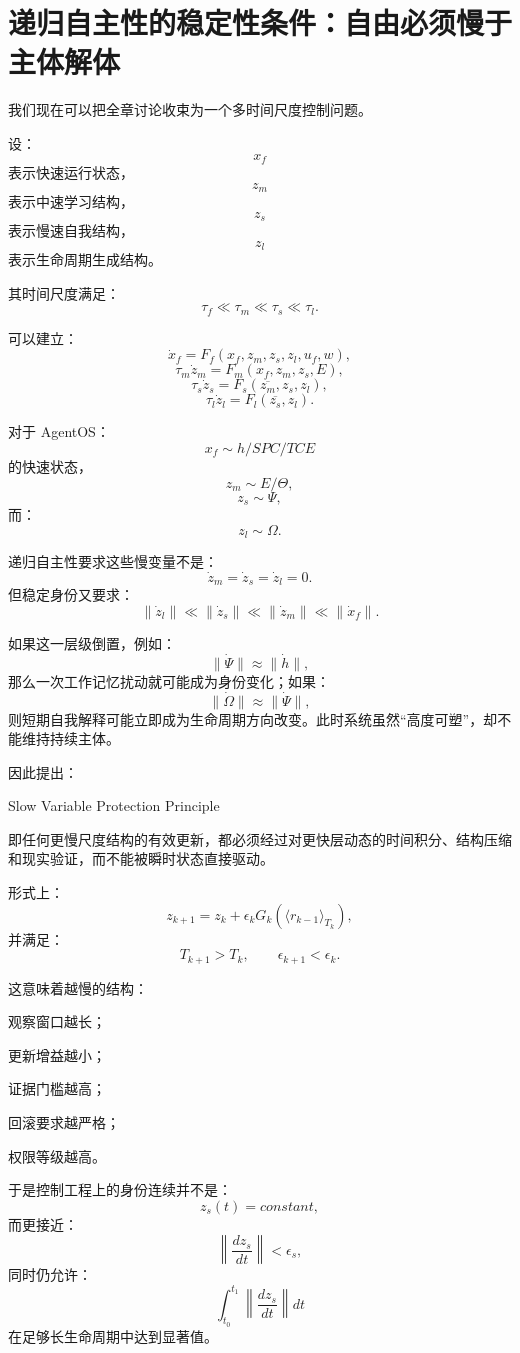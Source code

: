 \section{递归自主性的稳定性条件：自由必须慢于主体解体}

我们现在可以把全章讨论收束为一个多时间尺度控制问题。

设：
\[
x_f
\]
表示快速运行状态，
\[
z_m
\]
表示中速学习结构，
\[
z_s
\]
表示慢速自我结构，
\[
z_l
\]
表示生命周期生成结构。

其时间尺度满足：
\[
\tau_f
\ll
\tau_m
\ll
\tau_s
\ll
\tau_l.
\]

可以建立：
\[
\dot x_f
=
F_f(
x_f,z_m,z_s,z_l,u_f,w
),
\]
\[
\tau_m\dot z_m
=
F_m(
x_f,z_m,z_s,E
),
\]
\[
\tau_s\dot z_s
=
F_s(
\overline{z_m},z_s,z_l
),
\]
\[
\tau_l\dot z_l
=
F_l(
\overline{z_s},z_l
).
\]

对于 AgentOS：
\[
x_f\sim h/SPC/TCE
\]
的快速状态，
\[
z_m\sim E/\Theta,
\]
\[
z_s\sim\Psi,
\]
而：
\[
z_l\sim\Omega.
\]

递归自主性要求这些慢变量不是：
\[
\dot z_m
=
\dot z_s
=
\dot z_l
=
0.
\]
但稳定身份又要求：
\[
\boxed{
\|\dot z_l\|
\ll
\|\dot z_s\|
\ll
\|\dot z_m\|
\ll
\|\dot x_f\|.
}
\]

如果这一层级倒置，例如：
\[
\|\dot\Psi\|
\approx
\|\dot h\|,
\]
那么一次工作记忆扰动就可能成为身份变化；如果：
\[
\|\dot\Omega\|
\approx
\|\dot\Psi\|,
\]
则短期自我解释可能立即成为生命周期方向改变。此时系统虽然“高度可塑”，却不能维持持续主体。

因此提出：

\begin{statementbox}
Slow Variable Protection Principle
\end{statementbox}

即任何更慢尺度结构的有效更新，都必须经过对更快层动态的时间积分、结构压缩和现实验证，而不能被瞬时状态直接驱动。

形式上：
\[
z_{k+1}
=
z_k
+
\epsilon_k
G_k(
\langle r_{k-1}\rangle_{T_k}
),
\]
并满足：
\[
T_{k+1}
>
T_k,
\qquad
\epsilon_{k+1}
<
\epsilon_k.
\]

这意味着越慢的结构：

观察窗口越长；

更新增益越小；

证据门槛越高；

回滚要求越严格；

权限等级越高。

于是控制工程上的身份连续并不是：
\[
z_s(t)=constant,
\]
而更接近：
\[
\left\|
\frac{dz_s}{dt}
\right\|
<
\epsilon_s,
\]
同时仍允许：
\[
\int_{t_0}^{t_1}
\left\|
\frac{dz_s}{dt}
\right\|
dt
\]
在足够长生命周期中达到显著值。

